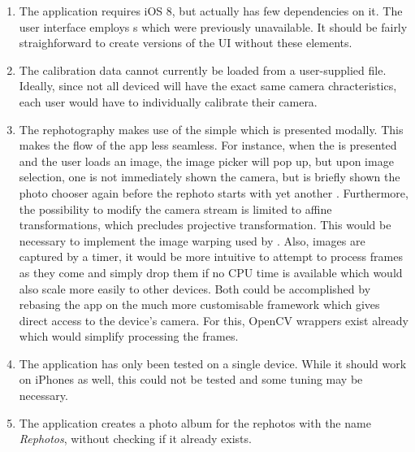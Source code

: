 \begin{enumerate}
   \item The application requires iOS 8, but actually has few dependencies on
      it. The user interface employs s which were
      previously unavailable. It should be fairly straighforward to create
      versions of the UI without these elements.

   \item The calibration data cannot currently be loaded from a user-supplied
      file. Ideally, since not all deviced will have the exact same camera
      chracteristics, each user would have to individually calibrate their
      camera.

   \item The rephotography makes use of the simple
       which is presented modally. This makes the
      flow of the app less seamless. For instance, when the
       is presented and the user loads an image,
      the image picker will pop up, but upon image selection, one is not
      immediately shown the camera, but is briefly shown the photo chooser again
      before the rephoto starts with yet another .
      Furthermore, the possibility to modify the camera stream is limited to
      affine transformations, which precludes projective transformation. This
      would be necessary to implement the image warping used by \citet{bae2010}.
      Also, images are captured by a timer, it would be more intuitive to
      attempt to process frames as they come and simply drop them if no CPU time
      is available which would also scale more easily to other devices. Both
      could be accomplished by rebasing the app on the much more customisable
       framework which gives direct access to the device's
      camera. For this, OpenCV wrappers exist already which would simplify
      processing the frames.  

   \item The application has only been tested on a single device. While it
      should work on iPhones as well, this could not be tested and some tuning
      may be necessary.

   \item The application creates a photo album for the rephotos with the name
      \emph{Rephotos}, without checking if it already exists.

\end{enumerate}


